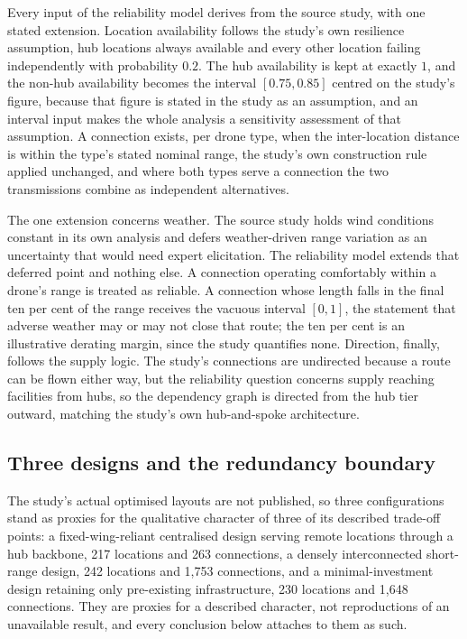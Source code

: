\documentclass[12pt]{report}
\begin{document}
Every input of the reliability model derives from the source study, with one stated extension. Location availability follows the study's own resilience assumption, hub locations always available and every other location failing independently with probability $0.2$. The hub availability is kept at exactly $1$, and the non-hub availability becomes the interval $[0.75, 0.85]$ centred on the study's figure, because that figure is stated in the study as an assumption, and an interval input makes the whole analysis a sensitivity assessment of that assumption. A connection exists, per drone type, when the inter-location distance is within the type's stated nominal range, the study's own construction rule applied unchanged, and where both types serve a connection the two transmissions combine as independent alternatives.

The one extension concerns weather. The source study holds wind conditions constant in its own analysis and defers weather-driven range variation as an uncertainty that would need expert elicitation. The reliability model extends that deferred point and nothing else. A connection operating comfortably within a drone's range is treated as reliable. A connection whose length falls in the final ten per cent of the range receives the vacuous interval $[0,1]$, the statement that adverse weather may or may not close that route; the ten per cent is an illustrative derating margin, since the study quantifies none. Direction, finally, follows the supply logic. The study's connections are undirected because a route can be flown either way, but the reliability question concerns supply reaching facilities from hubs, so the dependency graph is directed from the hub tier outward, matching the study's own hub-and-spoke architecture.

\subsection{Three designs and the redundancy boundary}
\label{sec:pp-case-designs}

The study's actual optimised layouts are not published, so three configurations stand as proxies for the qualitative character of three of its described trade-off points: a fixed-wing-reliant centralised design serving remote locations through a hub backbone, 217 locations and 263 connections, a densely interconnected short-range design, 242 locations and 1{,}753 connections, and a minimal-investment design retaining only pre-existing infrastructure, 230 locations and 1{,}648 connections. They are proxies for a described character, not reproductions of an unavailable result, and every conclusion below attaches to them as such.
\end{document}
